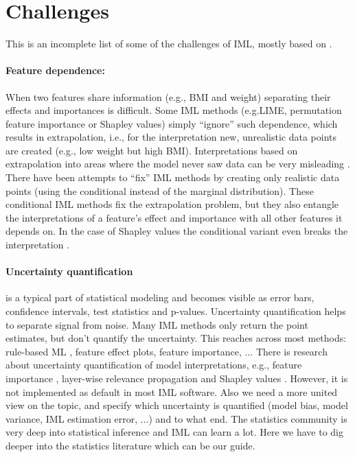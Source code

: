 \documentclass[runningheads]{llncs}
\begin{document}
\section*{Challenges}

This is an incomplete list of some of the challenges of IML, mostly based on \cite{molnar2020pitfalls}.

\paragraph{Feature dependence:} When two features share information (e.g., BMI and weight) separating their effects and importances is difficult.
Some IML methods (e.g.LIME, permutation feature importance or Shapley values) simply \enquote{ignore} such dependence, which results in extrapolation, i.e., for the interpretation new, unrealistic data points are created (e.g., low weight but high BMI).
Interpretations based on extrapolation into areas where the model never saw data can be very misleading \cite{hooker2019please}.
There have been attempts to \enquote{fix} IML methods by creating only realistic data points (using the conditional instead of the marginal distribution).
These conditional IML methods fix the extrapolation problem, but they also entangle the interpretations of a feature's effect and importance with all other features it depends on.
In the case of Shapley values the conditional variant even breaks the interpretation \cite{sundararajan2019many,janzing2019feature}.

\paragraph{Uncertainty quantification} is a typical part of statistical modeling and becomes visible as error bars, confidence intervals, test statistics and p-values.
Uncertainty quantification helps to separate signal from noise.
Many IML methods only return the point estimates, but don't quantify the uncertainty.
This reaches across most methods: rule-based ML , feature effect plots, feature importance, ...
There is research about uncertainty quantification of model interpretations, e.g., feature importance \cite{watson2019testing,fisher2019all}, layer-wise relevance propagation \cite{fabi2020feature} and Shapley values \cite{williamson2020efficient}.
However, it is not implemented as default in most IML software.
Also we need a more united view on the topic, and specify which uncertainty is quantified (model bias, model variance, IML estimation error, ...) and to what end.
The statistics community is very deep into statistical inference and IML can learn a lot.
Here we have to dig deeper into the statistics literature which can be our guide.
\end{document}
